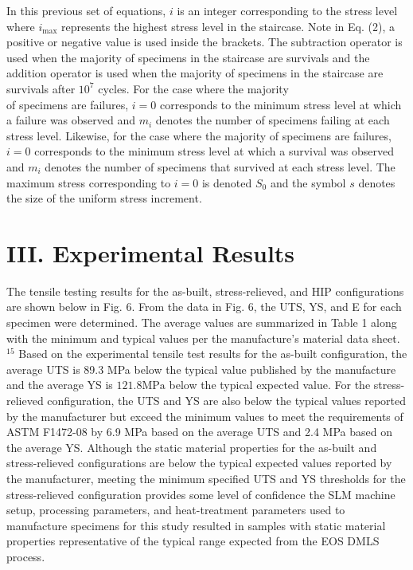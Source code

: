 \documentclass[10pt]{article}
\begin{document}
In this previous set of equations, $i$ is an integer corresponding to the stress level where $i_{\max }$ represents the highest stress level in the staircase. Note in Eq. (2), a positive or negative value is used inside the brackets. The subtraction operator is used when the majority of specimens in the staircase are survivals and the addition operator is used when the majority of specimens in the staircase are survivals after $10^{7}$ cycles. For the case where the majority\\
of specimens are failures, $i=0$ corresponds to the minimum stress level at which a failure was observed and $m_{i}$ denotes the number of specimens failing at each stress level. Likewise, for the case where the majority of specimens are failures, $i=0$ corresponds to the minimum stress level at which a survival was observed and $m_{i}$ denotes the number of specimens that survived at each stress level. The maximum stress corresponding to $i=0$ is denoted $S_{0}$ and the symbol $s$ denotes the size of the uniform stress increment.

\section*{III. Experimental Results}
The tensile testing results for the as-built, stress-relieved, and HIP configurations are shown below in Fig. 6. From the data in Fig. 6, the UTS, YS, and E for each specimen were determined. The average values are summarized in Table 1 along with the minimum and typical values per the manufacture's material data sheet. ${ }^{15}$ Based on the experimental tensile test results for the as-built configuration, the average UTS is 89.3 MPa below the typical value published by the manufacture and the average YS is $121.8 \mathrm{MPa}$ below the typical expected value. For the stress-relieved configuration, the UTS and YS are also below the typical values reported by the manufacturer but exceed the minimum values to meet the requirements of ASTM F1472-08 by 6.9 MPa based on the average UTS and 2.4 MPa based on the average YS. Although the static material properties for the as-built and stress-relieved configurations are below the typical expected values reported by the manufacturer, meeting the minimum specified UTS and YS thresholds for the stress-relieved configuration provides some level of confidence the SLM machine setup, processing parameters, and heat-treatment parameters used to manufacture specimens for this study resulted in samples with static material properties representative of the typical range expected from the EOS DMLS process.
\end{document}
